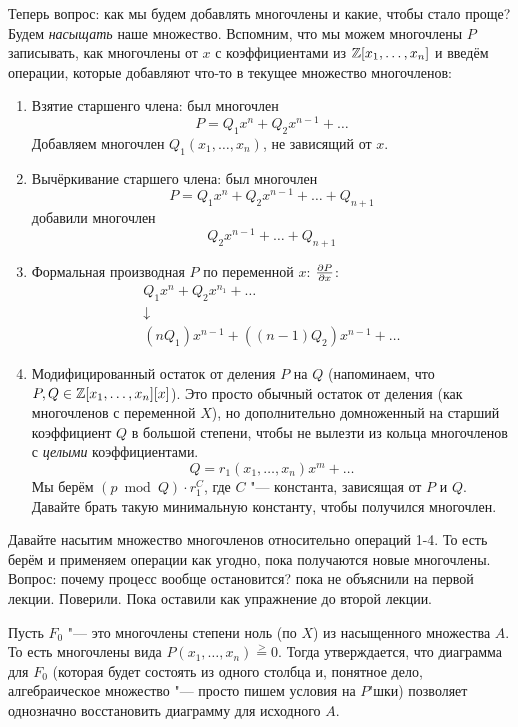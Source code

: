 	Теперь вопрос: как мы будем добавлять многочлены и какие, чтобы стало проще?
	Будем \textit{насыщать} наше множество.
	Вспомним, что мы можем многочлены $P$ записывать, как многочлены от $x$ с коэффициентами из $\mathbb{Z}[x_1, \dots, x_n]$ и
	введём операции, которые добавляют что-то в текущее множество многочленов:
	\begin{enumerate}
	\item
		Взятие старшенго члена: был многочлен
		\[ P = Q_1x^n + Q_2x^{n-1} + \dots \]
		Добавляем многочлен $Q_1(x_1, \dots, x_n)$, не зависящий от $x$.
	\item
		Вычёркивание старшего члена: был многочлен
		\[ P = Q_1 x^n + Q_2 x^{n-1} + \dots + Q_{n+1} \]
		добавили многочлен
		\[ Q_2 x^{n-1} + \dots + Q_{n+1} \]
	\item
		Формальная производная $P$ по переменной $x$: $\frac{\partial P}{\partial x}$:
		\begin{gather*}
		Q_1x^n + Q_2x^{n_1} + \dots \\
		\downarrow \\
		(nQ_1)x^{n-1} + ((n-1)Q_2)x^{n-1} + \dots
		\end{gather*}
	\item
		Модифицированный остаток от деления $P$ на $Q$ (напоминаем, что $P, Q \in \mathbb{Z}[x_1, \dots, x_n][x]$).
		Это просто обычный остаток от деления (как многочленов с переменной $X$), но дополнительно домноженный на старший коэффициент $Q$ в большой степени,
		чтобы не вылезти из кольца многочленов с \textsl{целыми} коэффициентами.
		\[ Q = r_1(x_1, \dots, x_n) x^m + \dots \]
		Мы берём $(p \bmod Q) \cdot r_1 ^ C$, где $C$ "--- константа, зависящая от $P$ и $Q$.
		Давайте брать такую минимальную константу, чтобы получился многочлен.
	\end{enumerate}
	Давайте насытим множество многочленов относительно операций 1-4.
	То есть берём и применяем операции как угодно, пока получаются новые многочлены.
	Вопрос: почему процесс вообще остановится? \TODO пока не объяснили на первой лекции.
	Поверили.
	Пока оставили как упражнение до второй лекции.

	Пусть $F_0$ "--- это многочлены степени ноль (по $X$) из насыщенного множества $A$.
	То есть многочлены вида $P(x_1, \dots, x_n) \stackrel{>}{=} 0$.
	Тогда утверждается, что диаграмма для $F_0$ (которая будет состоять из одного столбца и, понятное дело,
	алгебраическое множество "--- просто пишем условия на $P$'шки) позволяет однозначно восстановить
	диаграмму для исходного $A$.

